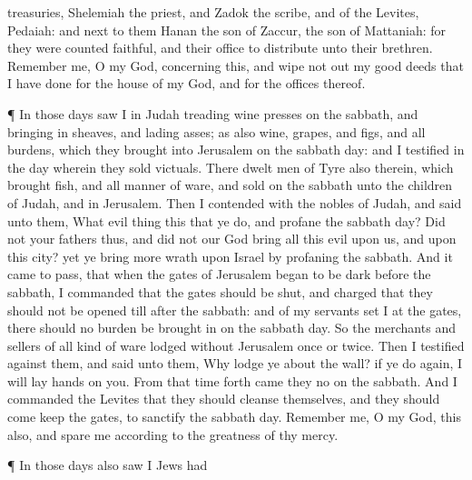 {treasuries,
Shelemiah the
priest, and
Zadok the
scribe, and of the
Levites,
Pedaiah: and next to
them
{}
Hanan the
son of
Zaccur, the
son of
Mattaniah: for they were
counted
faithful, and their office
{} to
distribute unto their
brethren.
Remember me, O my
God, concerning this, and wipe not
out my
good deeds that I have
done for the
house of my
God, and for the
offices thereof.
\par }{\PP {}¶ In those
days
saw I in
Judah
{}
treading wine
presses on the
sabbath, and bringing
in
sheaves, and
lading
asses; as also
wine,
grapes, and
figs, and all
{}
burdens, which they
brought into
Jerusalem on the
sabbath
day: and I
testified
{} in the
day wherein they
sold
victuals.
There
dwelt men of
Tyre also therein, which
brought
fish, and all manner of
ware, and
sold on the
sabbath unto the
children of
Judah, and in
Jerusalem.
Then I
contended with the
nobles of
Judah, and
said unto them, What
evil
thing
{} this that ye
do, and
profane the
sabbath
day?
Did not your
fathers thus, and
did not our
God
bring all this
evil upon us, and upon this
city? yet ye
bring
more
wrath upon
Israel by
profaning the
sabbath.
And it came to pass, that when the
gates of
Jerusalem began to be
dark
before the
sabbath, I
commanded that the
gates should be
shut, and
charged that they should not be
opened till
after the
sabbath: and
{} of my
servants
set I at the
gates,
{} there should no
burden be brought
in on the
sabbath
day.
So the
merchants and
sellers of all kind of
ware
lodged
without
Jerusalem
once or
twice.
Then I
testified against them, and
said unto them, Why
lodge ye
about the
wall? if ye do
{}
again, I will
lay
hands on you. From that
time forth
came they no
{} on the
sabbath.
And I
commanded the
Levites that they should
cleanse themselves, and
{} they should
come
{}
keep the
gates, to
sanctify the
sabbath
day.
Remember me, O my
God,
{} this also, and
spare me according to the
greatness of thy
mercy.
\par }{\PP {}¶ In those
days also
saw I
Jews
{} had
}
